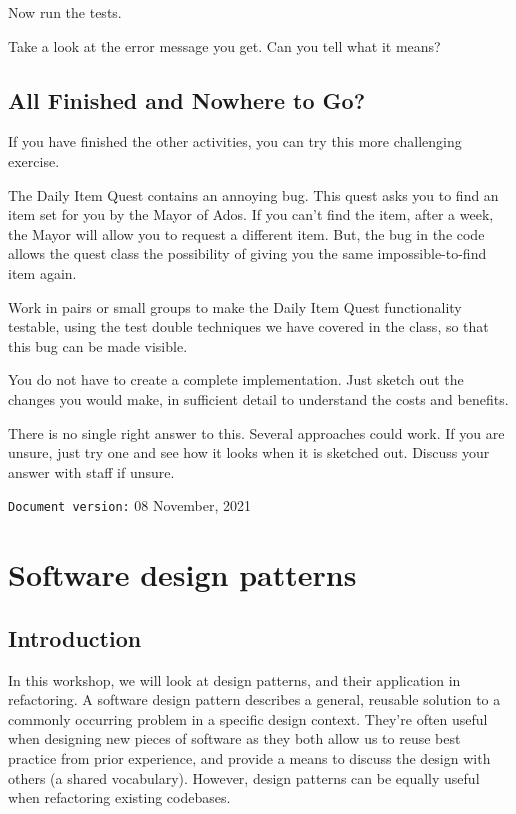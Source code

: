 \documentclass[
]{book}
\begin{document}
Now run the tests.

Take a look at the error message you get. Can you tell what it means?

\hypertarget{next}{%
\section{All Finished and Nowhere to Go?}\label{next}}

If you have finished the other activities, you can try this more challenging exercise.

The Daily Item Quest contains an annoying bug. This quest asks you to find an item set for you by the Mayor of Ados. If you can't find the item, after a week, the Mayor will allow you to request a different item. But, the bug in the code allows the quest class the possibility of giving you the same impossible-to-find item again.

Work in pairs or small groups to make the Daily Item Quest functionality testable, using the test double techniques we have covered in the class, so that this bug can be made visible.

You do not have to create a complete implementation. Just sketch out the changes you would make, in sufficient detail to understand the costs and benefits.

There is no single right answer to this. Several approaches could work. If you are unsure, just try one and see how it looks when it is sketched out. Discuss your answer with staff if unsure.

\texttt{Document\ version:} 08 November, 2021

\hypertarget{patterning}{%
\chapter{Software design patterns}\label{patterning}}

\hypertarget{introduction}{%
\section{Introduction}\label{introduction}}

In this workshop, we will look at design patterns, and their application in refactoring. A software design pattern describes a general, reusable solution to a commonly occurring problem in a specific design context. They're often useful when designing new pieces of software as they both allow us to reuse best practice from prior experience, and provide a means to discuss the design with others (a shared vocabulary). However, design patterns can be equally useful when refactoring existing codebases.
\end{document}
